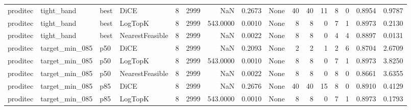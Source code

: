 \begin{tabular}{llllrrrrlrrrrrrr}
proditec &           tight\_band &   best &            DiCE &            8 &                 2999 &                      NaN &      0.2673 &                                               None &     40 &           40 &       11 &              8 &          0 &             0.8954 &         0.9787 \\
proditec &           tight\_band &   best &         LogTopK &            8 &                 2999 &                 543.0000 &      0.0010 &                                               None &      8 &            8 &        0 &              7 &          1 &             0.8973 &         0.2130 \\
proditec &           tight\_band &   best & NearestFeasible &            8 &                 2999 &                      NaN &      0.0022 &                                               None &      8 &            8 &        0 &              4 &          4 &             0.8897 &         0.0131 \\
proditec &       target\_min\_085 &    p50 &            DiCE &            8 &                 2999 &                      NaN &      0.2093 &                                               None &      2 &            2 &        1 &              2 &          6 &             0.8704 &         2.6709 \\
proditec &       target\_min\_085 &    p50 &         LogTopK &            8 &                 2999 &                 543.0000 &      0.0010 &                                               None &      8 &            8 &        0 &              7 &          1 &             0.8973 &         3.8250 \\
proditec &       target\_min\_085 &    p50 & NearestFeasible &            8 &                 2999 &                      NaN &      0.0022 &                                               None &      8 &            8 &        0 &              8 &          0 &             0.8661 &         3.6355 \\
proditec &       target\_min\_085 &    p85 &            DiCE &            8 &                 2999 &                      NaN &      0.2676 &                                               None &     40 &           40 &       15 &              8 &          0 &             0.8910 &         0.4129 \\
proditec &       target\_min\_085 &    p85 &         LogTopK &            8 &                 2999 &                 543.0000 &      0.0010 &                                               None &      8 &            8 &        0 &              7 &          1 &             0.8973 &         0.1793 \\

\end{tabular}
